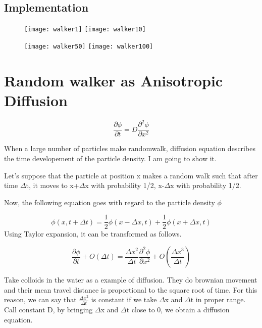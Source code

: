 \documentclass[12pt,a4paper]{scrartcl}
\begin{document}
\subsection{Implementation}

\begin{figure}
  \centering
  \texttt{[image: walker1]}
  \texttt{[image: walker10]}
\end{figure}

\begin{figure}
  \texttt{[image: walker50]}
  \texttt{[image: walker100]}
\end{figure}

\clearpage


\clearpage
\section{Random walker as Anisotropic Diffusion}
\[
\frac{\partial \phi}{\partial t} = D \frac{\partial^{2} \phi}{\partial x^{2}}
\]

When a large number of particles make randomwalk, diffusion equation describes the time developement of the particle density. I am going to show it.

Let's suppose that the particle at position x makes a random walk such that after time \(\Delta\)t, it moves to x+\(\Delta\)x with probability 1/2, x-\(\Delta\)x with probability 1/2.

Now, the following equation goes with regard to the particle density \(\phi\)

\[
\phi (x,t+\Delta t) = \frac{1}{2}\phi (x-\Delta x,t) + \frac{1}{2}\phi (x+\Delta x,t)
\]
Using Taylor expansion, it can be transformed as follows.

\[
\frac{\partial \phi}{\partial t} + O(\Delta t) = \frac{\Delta x^{2}}{\Delta t} \frac{\partial^{2} \phi}{\partial x^{2}} + O(\frac{\Delta x^{3}}{\Delta t})
\]

Take colloids in the water as a example of diffusion. They do brownian movement and their mean travel distance is proportional to the square root of time. For this reason, we can say that \(\frac{\Delta x^{2}}{\Delta t}\) is constant if we take \(\Delta\)x and \(\Delta\)t in proper range. Call constant D, by bringing \(\Delta\)x and \(\Delta\)t close to 0, we obtain a diffusion equation.
\end{document}

